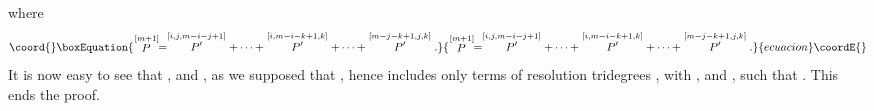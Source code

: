 \documentclass[a4paper,12pt]{article}
\begin{document}
where 
\begin{equation}\coord{}\boxEquation{
\stackrel{\lbrack m+1]}{P}=\stackrel{[i,j,m-i-j+1]}{P^{\prime }}+\cdots +
\stackrel{[i,m-i-k+1,k]}{P^{\prime }}+\cdots +\stackrel{[m-j-k+1,j,k]}{
P^{\prime }}.  \label{sp3.ap64}
}{
\stackrel{\lbrack m+1]}{P}=\stackrel{[i,j,m-i-j+1]}{P^{\prime }}+\cdots +
\stackrel{[i,m-i-k+1,k]}{P^{\prime }}+\cdots +\stackrel{[m-j-k+1,j,k]}{
P^{\prime }}.  }{ecuacion}\coordE{}\end{equation}
It is now easy to see that \coordHE{}, \coordHE{} and \coordHE{}, as we supposed that \coordHE{}, hence \coordHE{} includes only
terms of resolution tridegrees \coordHE{},
with \coordHE{}, \coordHE{} and \coordHE{}, such that \coordHE{}. This ends the proof.
\end{document}
